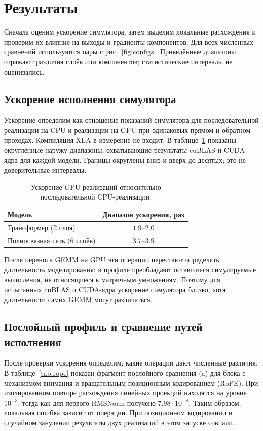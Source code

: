 \section{Результаты}
\label{sec:results}

Сначала оценим ускорение симулятора, затем выделим локальные расхождения
и проверим их влияние на выходы и градиенты компонентов.
Для всех численных сравнений используются пары с рис.~\ref{fig:configs}.
Приведённые диапазоны отражают различия слоёв или компонентов;
статистические интервалы не оценивались.

\subsection{Ускорение исполнения симулятора}

Ускорение определим как отношение показаний симулятора
для последовательной реализации на CPU и реализации на GPU
при одинаковых прямом и обратном проходах.
Компиляция XLA в измерение не входит.
В таблице~\ref{tab:speedup} показаны округлённые наружу диапазоны,
охватывающие результаты cuBLAS и CUDA-ядра для каждой модели.
Границы округлены вниз и вверх до десятых; это не доверительные интервалы.

\begin{table}[htbp]
    \centering
    \caption{Ускорение GPU-реализаций относительно последовательной CPU-реализации.}
    \label{tab:speedup}
    \begin{tabular}{l c}
        \hline
        Модель & Диапазон ускорения, раз \\
        \hline
        Трансформер (2 слоя) & $1.9$--$2.0$ \\
        Полносвязная сеть (6 слоёв) & $3.7$--$3.9$ \\
        \hline
    \end{tabular}
\end{table}

После переноса GEMM на GPU эти операции перестают определять
длительность моделирования: в профиле преобладают оставшиеся
симулируемые вычисления, не относящиеся к матричным умножениям.
Поэтому для испытанных cuBLAS и CUDA-ядра ускорение симулятора
близко, хотя длительности самих GEMM могут различаться.

\subsection{Послойный профиль и сравнение путей исполнения}

После проверки ускорения определим, какие операции дают численные
различия. В таблице~\ref{tab:rope} показан фрагмент послойного сравнения (a)
для блока с механизмом внимания и вращательным позиционным кодированием (RoPE).
При изолированном повторе расхождения линейных проекций находятся
на уровне $10^{-3}$, тогда как для первого RMSNorm получено
$7.98\cdot10^{-8}$. Таким образом, локальная ошибка зависит от операции.
При позиционном кодировании и случайном занулении
результаты двух реализаций в этом запуске совпали.

